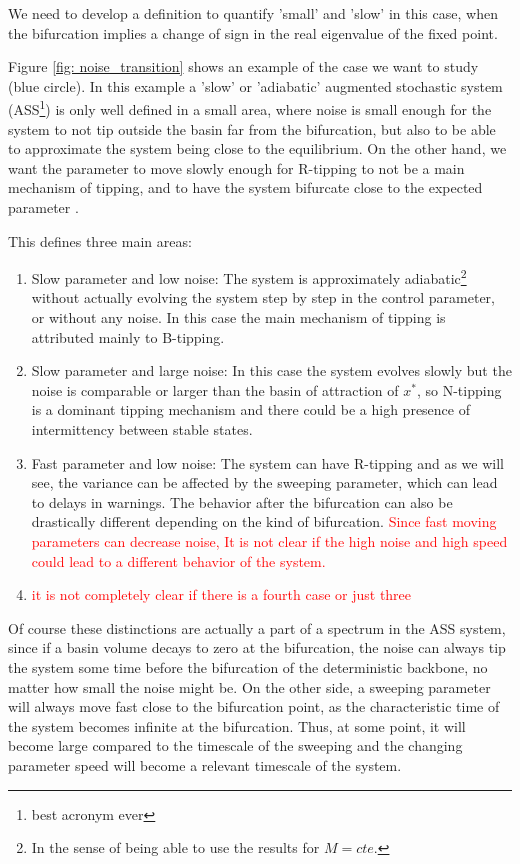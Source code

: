We need to develop a definition to quantify 'small' and 'slow' in this case, when the bifurcation implies a change of sign in the real eigenvalue of the fixed point. 
 
Figure \ref{fig: noise_transition} shows an example of the case we want to study (blue circle). 
In this example a 'slow' or 'adiabatic' augmented stochastic system (ASS\footnote{best acronym ever}) is only well defined in a small area, where noise is small enough for the system to not tip outside the basin far from the bifurcation, but also to be able to approximate the system being close to the equilibrium. On the other hand, we want the parameter to move slowly enough for R-tipping to not be a main mechanism of tipping, and to have the system bifurcate close to the expected parameter \citep{Marconi2020a}.%

This defines three main areas:
\begin{enumerate}
	\item Slow parameter and low noise: The system is approximately adiabatic\footnote{In the sense of being able to use the results for $M=cte$.} without actually evolving the system step by step in the control parameter, or without any noise. In this case the main mechanism of tipping is attributed mainly to B-tipping. 
	
	\item Slow parameter and large noise: In this case the system evolves slowly but the noise is comparable or larger than the basin of attraction of $x^*$, so N-tipping is a dominant tipping mechanism and there could be a high presence of intermittency between stable states.
	
	\item Fast parameter and low noise: The system can have R-tipping and as we will see, the variance can be affected by the sweeping parameter, which can lead to delays in warnings. The behavior after the bifurcation can also be drastically different depending on the kind of bifurcation.
	\textcolor{red}{Since fast moving parameters can decrease noise, It is not clear if the high noise and high speed could lead to a different behavior of the system.}

	\item \textcolor{red}{it is not completely clear if there is a fourth case or just three}
\end{enumerate}  

Of course these distinctions are actually a part of a spectrum in the ASS system, since if a basin volume decays to zero at the bifurcation, the noise can always tip the system some time before the bifurcation of the deterministic backbone, no matter how small the noise might be. 
On the other side, a sweeping parameter will always move fast close to the bifurcation point, as the characteristic time of the system becomes infinite at the bifurcation. Thus, at some point, it will become large compared to the timescale of the sweeping and the changing parameter speed will become a relevant timescale of the system.

